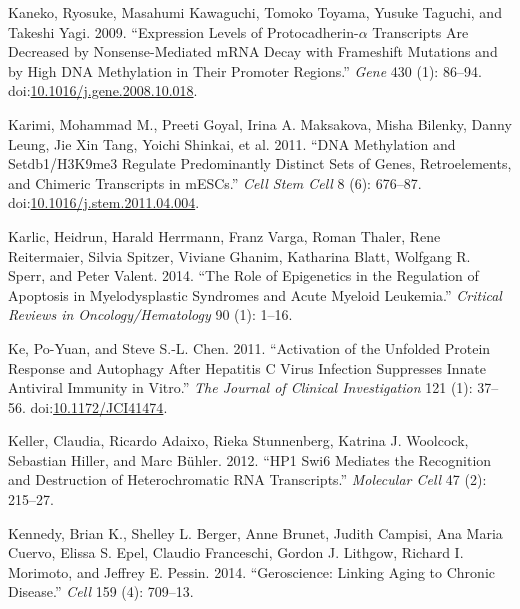 \documentclass[onehalf,12pt]{beavtex}
\begin{document}
  \hypertarget{ref-KanekoExpressionlevelsProtocadherina2009}{}
  Kaneko, Ryosuke, Masahumi Kawaguchi, Tomoko Toyama, Yusuke Taguchi, and
  Takeshi Yagi. 2009. ``Expression Levels of Protocadherin-\(\alpha\)
  Transcripts Are Decreased by Nonsense-Mediated mRNA Decay with
  Frameshift Mutations and by High DNA Methylation in Their Promoter
  Regions.'' \emph{Gene} 430 (1): 86--94.
  doi:\href{https://doi.org/10.1016/j.gene.2008.10.018}{10.1016/j.gene.2008.10.018}.
  
  \hypertarget{ref-KarimiDNAMethylationSETDB12011}{}
  Karimi, Mohammad M., Preeti Goyal, Irina A. Maksakova, Misha Bilenky,
  Danny Leung, Jie Xin Tang, Yoichi Shinkai, et al. 2011. ``DNA
  Methylation and Setdb1/H3K9me3 Regulate Predominantly Distinct Sets of
  Genes, Retroelements, and Chimeric Transcripts in mESCs.'' \emph{Cell
  Stem Cell} 8 (6): 676--87.
  doi:\href{https://doi.org/10.1016/j.stem.2011.04.004}{10.1016/j.stem.2011.04.004}.
  
  \hypertarget{ref-Karlicroleepigeneticsregulation2014}{}
  Karlic, Heidrun, Harald Herrmann, Franz Varga, Roman Thaler, Rene
  Reitermaier, Silvia Spitzer, Viviane Ghanim, Katharina Blatt, Wolfgang
  R. Sperr, and Peter Valent. 2014. ``The Role of Epigenetics in the
  Regulation of Apoptosis in Myelodysplastic Syndromes and Acute Myeloid
  Leukemia.'' \emph{Critical Reviews in Oncology/Hematology} 90 (1):
  1--16.
  
  \hypertarget{ref-KeActivationunfoldedprotein2011}{}
  Ke, Po-Yuan, and Steve S.-L. Chen. 2011. ``Activation of the Unfolded
  Protein Response and Autophagy After Hepatitis C Virus Infection
  Suppresses Innate Antiviral Immunity in Vitro.'' \emph{The Journal of
  Clinical Investigation} 121 (1): 37--56.
  doi:\href{https://doi.org/10.1172/JCI41474}{10.1172/JCI41474}.
  
  \hypertarget{ref-KellerHP1Swi6mediates2012}{}
  Keller, Claudia, Ricardo Adaixo, Rieka Stunnenberg, Katrina J. Woolcock,
  Sebastian Hiller, and Marc Bühler. 2012. ``HP1 Swi6 Mediates the
  Recognition and Destruction of Heterochromatic RNA Transcripts.''
  \emph{Molecular Cell} 47 (2): 215--27.
  
  \hypertarget{ref-KennedyGerosciencelinkingaging2014}{}
  Kennedy, Brian K., Shelley L. Berger, Anne Brunet, Judith Campisi, Ana
  Maria Cuervo, Elissa S. Epel, Claudio Franceschi, Gordon J. Lithgow,
  Richard I. Morimoto, and Jeffrey E. Pessin. 2014. ``Geroscience: Linking
  Aging to Chronic Disease.'' \emph{Cell} 159 (4): 709--13.
  
\end{document}
